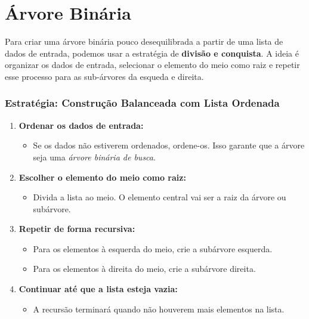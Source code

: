 \chapter{Árvore Binária}
\label{ch:arvore_binaria} %
Para criar uma árvore binária pouco desequilibrada a partir de uma lista de dados de entrada, podemos usar a estratégia de \textbf{divisão e conquista}. A ideia é organizar os dados de entrada, selecionar o elemento do meio como raiz e repetir esse processo para as sub-árvores da esqueda e direita.

\subsection*{Estratégia: Construção Balanceada com Lista Ordenada}

\begin{enumerate}
	\item \textbf{Ordenar os dados de entrada:}
	      \begin{itemize}
		      \item Se os dados não estiverem ordenados, ordene-os. Isso garante que a árvore seja uma \textit{árvore binária de busca}.
	      \end{itemize}

	\item \textbf{Escolher o elemento do meio como raiz:}
	      \begin{itemize}
		      \item Divida a lista ao meio. O elemento central vai ser a raiz da árvore ou subárvore.
	      \end{itemize}

	\item \textbf{Repetir de forma recursiva:}
	      \begin{itemize}
		      \item Para os elementos à esquerda do meio, crie a subárvore esquerda.
		      \item Para os elementos à direita do meio, crie a subárvore direita.
	      \end{itemize}

	\item \textbf{Continuar até que a lista esteja vazia:}
	      \begin{itemize}
		      \item A recursão terminará quando não houverem mais elementos na lista.
	      \end{itemize}
\end{enumerate}

